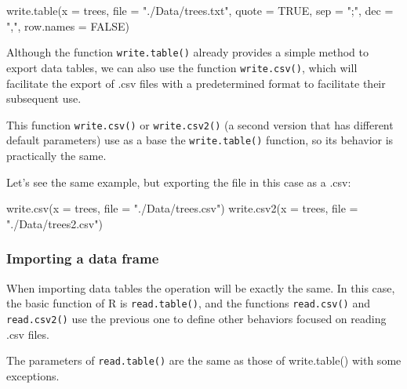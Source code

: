 \documentclass[
]{book}
\newenvironment{Shaded}{\begin{snugshade}}{\end{snugshade}}
\newcommand{\AttributeTok}[1]{\textcolor[rgb]{0.77,0.63,0.00}{#1}}
\newcommand{\ConstantTok}[1]{\textcolor[rgb]{0.00,0.00,0.00}{#1}}
\newcommand{\FunctionTok}[1]{\textcolor[rgb]{0.00,0.00,0.00}{#1}}
\newcommand{\NormalTok}[1]{#1}
\newcommand{\StringTok}[1]{\textcolor[rgb]{0.31,0.60,0.02}{#1}}
\theoremstyle{definition}
\theoremstyle{definition}
\theoremstyle{definition}
\theoremstyle{definition}
\theoremstyle{remark}
\begin{document}
\begin{Shaded}
\begin{Highlighting}[]
\FunctionTok{write.table}\NormalTok{(}\AttributeTok{x =}\NormalTok{ trees, }\AttributeTok{file =} \StringTok{"./Data/trees.txt"}\NormalTok{, }\AttributeTok{quote =} \ConstantTok{TRUE}\NormalTok{, }\AttributeTok{sep =} \StringTok{";"}\NormalTok{, }\AttributeTok{dec =} \StringTok{","}\NormalTok{, }\AttributeTok{row.names =} \ConstantTok{FALSE}\NormalTok{)}
\end{Highlighting}
\end{Shaded}

Although the function \texttt{write.table()} already provides a simple method to export data tables, we can also use the function \texttt{write.csv()}, which will facilitate the export of .csv files with a predetermined format to facilitate their subsequent use.

This function \texttt{write.csv()} or \texttt{write.csv2()} (a second version that has different default parameters) use as a base the \texttt{write.table()} function, so its behavior is practically the same.

Let's see the same example, but exporting the file in this case as a .csv:

\begin{Shaded}
\begin{Highlighting}[]
\FunctionTok{write.csv}\NormalTok{(}\AttributeTok{x =}\NormalTok{ trees, }\AttributeTok{file =} \StringTok{"./Data/trees.csv"}\NormalTok{)}
\FunctionTok{write.csv2}\NormalTok{(}\AttributeTok{x =}\NormalTok{ trees, }\AttributeTok{file =} \StringTok{"./Data/trees2.csv"}\NormalTok{)}
\end{Highlighting}
\end{Shaded}

\hypertarget{importing-a-data-frame}{%
\subsubsection{Importing a data frame}\label{importing-a-data-frame}}

When importing data tables the operation will be exactly the same. In this case, the basic function of R is \texttt{read.table()}, and the functions \texttt{read.csv()} and \texttt{read.csv2()} use the previous one to define other behaviors focused on reading .csv files.

The parameters of \texttt{read.table()} are the same as those of write.table() with some exceptions.
\end{document}

